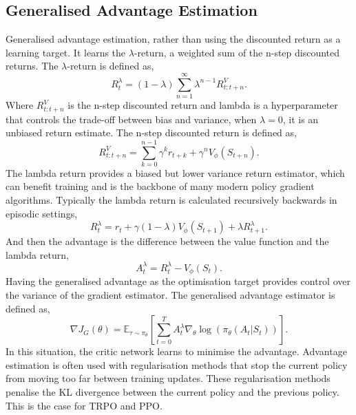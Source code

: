 \subsection{Generalised Advantage Estimation}
Generalised advantage estimation\cite{schulman2015high}, rather than using the discounted return as a learning target. It learns the $\lambda$-return, a weighted sum of the n-step discounted returns. The $\lambda$-return is defined as,
\begin{equation}
	R_t^\lambda = (1-\lambda) \sum_{n=1}^\infty \lambda^{n-1} R_{t:t+n}^V.
\end{equation}
Where $R_{t:t+n}^V$ is the n-step discounted return and lambda is a hyperparameter that controls the trade-off between bias and variance, when $\lambda = 0$, it is an unbiased return estimate. The n-step discounted return is defined as,
\begin{equation}
	R_{t:t+n}^V = \sum_{k=0}^{n-1} \gamma^k r_{t+k} + \gamma^n V_\phi(S_{t+n}).
\end{equation}
The lambda return provides a biased but lower variance return estimator, which can benefit training and is the backbone of many modern policy gradient algorithms. Typically the lambda return is calculated recursively backwards in episodic settings,
\begin{equation}
	R_t^\lambda = r_t + \gamma (1-\lambda) V_\phi(S_{t+1}) + \lambda R_{t+1}^\lambda.
\end{equation}
And then the advantage is the difference between the value function and the lambda return,
\begin{equation}
    A_t^\lambda = R_t^\lambda - V_\phi(S_t).
\end{equation}
Having the generalised advantage as the optimisation target provides control over the variance of the gradient estimator. The generalised advantage estimator is defined as,
\begin{equation}
    \nabla J_G(\theta)  = \mathbb{E}_{\tau \sim \pi_\theta} \left[\sum_{t=0} ^ T A_t^\lambda \nabla_\theta \log(\pi_\theta(A_t|S_t))\right].
\end{equation}
In this situation, the critic network learns to minimise the advantage. Advantage estimation is often used with regularisation methods that stop the current policy from moving too far between training updates. These regularisation methods penalise the KL divergence between the current policy and the previous policy. This is the case for TRPO\cite{shculman2015trust} and PPO\cite{schulman2017proximal}.

